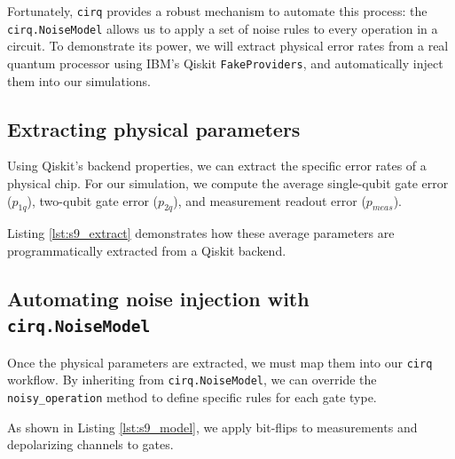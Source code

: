 Fortunately, \texttt{cirq} provides a robust mechanism to automate this process: the \texttt{cirq.NoiseModel} allows us to apply a set of noise rules to every operation in a circuit. To demonstrate its power, we will extract physical error rates from a real quantum processor using IBM's Qiskit \texttt{FakeProviders}, and automatically inject them into our simulations.

\subsection{Extracting physical parameters}

 Using Qiskit's backend properties, we can extract the specific error rates of a physical chip. For our simulation, we compute the average single-qubit gate error ($p_{1q}$), two-qubit gate error ($p_{2q}$), and measurement readout error ($p_{meas}$). 

Listing \ref{lst:s9_extract} demonstrates how these average parameters are programmatically extracted from a Qiskit backend.


\subsection{Automating noise injection with \texttt{cirq.NoiseModel}}

Once the physical parameters are extracted, we must map them into our \texttt{cirq} workflow. By inheriting from \texttt{cirq.NoiseModel}, we can override the \texttt{noisy\_operation} method to define specific rules for each gate type. 

As shown in Listing \ref{lst:s9_model}, we apply bit-flips to measurements and depolarizing channels to gates.


